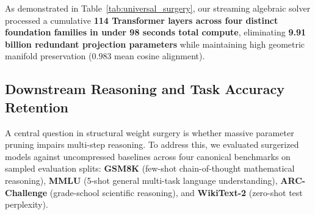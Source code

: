 \documentclass[journal,lettersize]{IEEEtran}
\begin{document}
\begin{table}[h]
\centering
\caption{Cross-Family Foundation Model Surgery Benchmarks}
\label{tab:universal_surgery}
\end{table}

As demonstrated in Table~\ref{tab:universal_surgery}, our streaming algebraic solver processed a cumulative \textbf{114 Transformer layers across four distinct foundation families in under 98 seconds total compute}, eliminating \textbf{9.91 billion redundant projection parameters} while maintaining high geometric manifold preservation ($0.983$ mean cosine alignment).

\subsection{Downstream Reasoning and Task Accuracy Retention}
A central question in structural weight surgery is whether massive parameter pruning impairs multi-step reasoning. To address this, we evaluated surgerized models against uncompressed baselines across four canonical benchmarks on sampled evaluation splits: \textbf{GSM8K} (few-shot chain-of-thought mathematical reasoning), \textbf{MMLU} (5-shot general multi-task language understanding), \textbf{ARC-Challenge} (grade-school scientific reasoning), and \textbf{WikiText-2} (zero-shot test perplexity).
\end{document}
